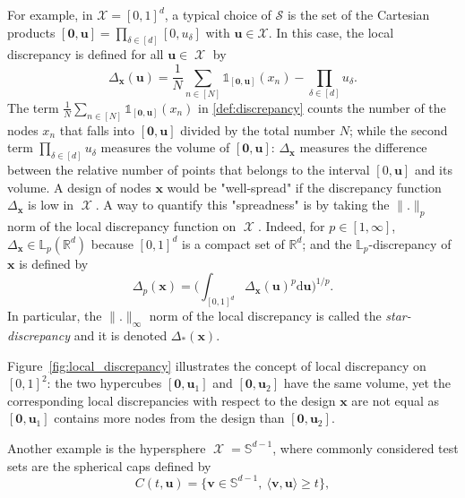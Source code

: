 \documentclass[twoside,11pt]{article}
\DeclareMathOperator{\X}{\mathcal{X}}
\begin{document}
  For example, in $\mathcal{X} = [0,1]^{d}$, a typical choice of $\mathcal{S}$ is the set of the Cartesian products $[\bm{0},\bm{u}] = \prod_{\delta \in [d]}[0,u_{\delta}]$ with $\bm{u} \in \mathcal{X}$. In this case, the local discrepancy is defined for all $\bm{u} \in \X$ by 
\begin{equation}\label{def:discrepancy}
\Delta_{\bm{x}}(\bm{u}) = \frac{1}{N}\sum\limits_{n \in [N]} \mathbb{1}_{[\bm{0},\bm{u}]}(x_{n}) - \prod\limits_{\delta \in [d]}u_{\delta}.
\end{equation}  
The term $\displaystyle \frac{1}{N}\sum\limits_{n \in [N]} \mathbb{1}_{[\bm{0},\bm{u}]}(x_{n})$ in \eqref{def:discrepancy} counts the number of the nodes $x_{n}$ that falls into $[\bm{0},\bm{u}]$ divided by the total number $N$; while the second term $\displaystyle  \prod\limits_{\delta \in [d]}u_{\delta}$ measures the volume of $[\bm{0},\bm{u}]$: $\Delta_{\bm{x}}$ measures the difference between the relative number of points that belongs to the interval $[0,\bm{u}]$ and its volume. A design of nodes $\bm{x}$ would be "well-spread" if the discrepancy function $\Delta_{\bm{x}}$ is low in $\X$. A way to quantify this "spreadness" is by taking the $\|.\|_{p}$ norm of the local discrepancy function on $\X$. Indeed, for $p \in [1,\infty]$, $\Delta_{\bm{x}} \in \mathbb{L}_{p}(\mathbb{R}^{d})$ because $[0,1]^{d}$ is a compact set of $\mathbb{R}^{d}$; and the $\mathbb{L}_{p}$-discrepancy of $\bm{x}$ is defined by 
\begin{equation}
\Delta_{p}(\bm{x}) = \bigg(\int_{[0,1]^{d}}\Delta_{\bm{x}}(\bm{u})^{p} \mathrm{d}\bm{u}\bigg)^{1/p}.
\end{equation}
In particular, the $\|.\|_{\infty}$ norm of the local discrepancy is called the \emph{star-discrepancy} and it is denoted $\Delta_{*}(\bm{x})$.

Figure~\ref{fig:local_discrepancy} illustrates the concept of local discrepancy on $[0,1]^{2}$: the two hypercubes $[\bm{0},\bm{u}_{1}]$ and $[\bm{0},\bm{u}_{2}]$ have the same volume, yet the corresponding local discrepancies with respect to the design $\bm{x}$ are not equal as $[\bm{0},\bm{u}_{1}]$ contains more nodes from the design than $[\bm{0},\bm{u}_{2}]$.

Another example is the hypersphere $\X = \mathbb{S}^{d-1}$, where commonly considered test sets are the spherical caps defined by
\begin{equation}
C(t,\bm{u}) = \{ \bm{v} \in \mathbb{S}^{d-1}, \: \langle \bm{v}, \bm{u} \rangle \geq t\},
\end{equation}
\end{document}

